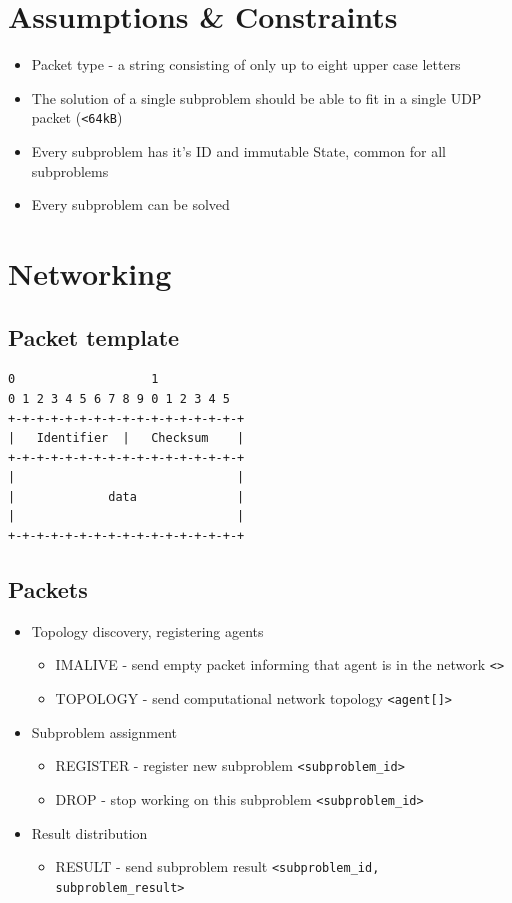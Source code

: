 \documentclass{article}
\begin{document}
\section{Assumptions \& Constraints}
\begin{itemize}
    \item Packet type - a string consisting of only up to eight upper case letters 
    \item The solution of a single subproblem should be able to fit in a single UDP packet (\verb!<64kB!)
    \item Every subproblem has it's ID and immutable State, common for all subproblems
    \item Every subproblem can be solved
\end{itemize}

\section{Networking}
\subsection{Packet template}
\begin{verbatim}
0                   1
0 1 2 3 4 5 6 7 8 9 0 1 2 3 4 5
+-+-+-+-+-+-+-+-+-+-+-+-+-+-+-+-+
|   Identifier  |   Checksum    |
+-+-+-+-+-+-+-+-+-+-+-+-+-+-+-+-+
|                               |
|             data              |
|                               |
+-+-+-+-+-+-+-+-+-+-+-+-+-+-+-+-+
\end{verbatim}

\subsection{Packets}
\begin{itemize}
    \item Topology discovery, registering agents
    \begin{itemize}
        \item IMALIVE - send empty packet informing that agent is in the network \verb!<>!
        \item TOPOLOGY - send computational network topology \verb!<agent[]>!
    \end{itemize}
    \item Subproblem assignment
    \begin{itemize}
        \item REGISTER - register new subproblem \verb!<subproblem_id>!
        \item DROP - stop working on this subproblem \verb!<subproblem_id>!
    \end{itemize}
    \item Result distribution
    \begin{itemize}
        \item RESULT - send subproblem result \verb!<subproblem_id, subproblem_result>!
    \end{itemize}
\end{itemize}
\end{document}

